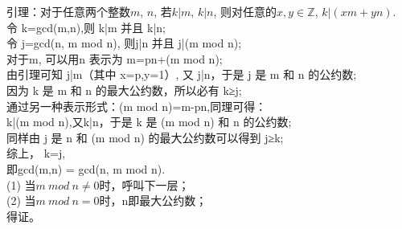 \documentclass[11pt, a4paper, UTF8]{ctexart}
\begin{document}
\begin{solution}
  引理：对于任意两个整数$m$, $n$, 若$k|m$, $k|n$, 则对任意的$x, y \in \mathbb{Z}$, 
  $k|(xm + yn)$.\\
  令 k=gcd(m,n),则 k|m 并且 k|n;\\
  令 j=gcd(n, m mod n), 则j|n 并且 j|(m mod n);\\
  对于m, 可以用n 表示为 m=pn+(m mod n);\\
  由引理可知 j|m（其中 x=p,y=1）, 又 j|n，于是 j 是 m 和 n 的公约数;\\
  因为 k 是 m 和 n 的最大公约数，所以必有 k≥j;\\
  通过另一种表示形式：(m mod n)=m-pn,同理可得：\\
  k|(m mod n),又k|n，于是 k 是 (m mod n) 和 n 的公约数;\\
  同样由 j 是 n 和 (m mod n) 的最大公约数可以得到 j≥k;\\
  综上， k=j,\\
  即gcd(m,n) = gcd(n, m mod n).\\
  (1) 当$m~ mod~ n \neq 0$时，呼叫下一层；\\
  (2) 当$m~ mod~ n = 0$时，n即最大公约数；\\
  得证。
\end{solution}




\end{document}
